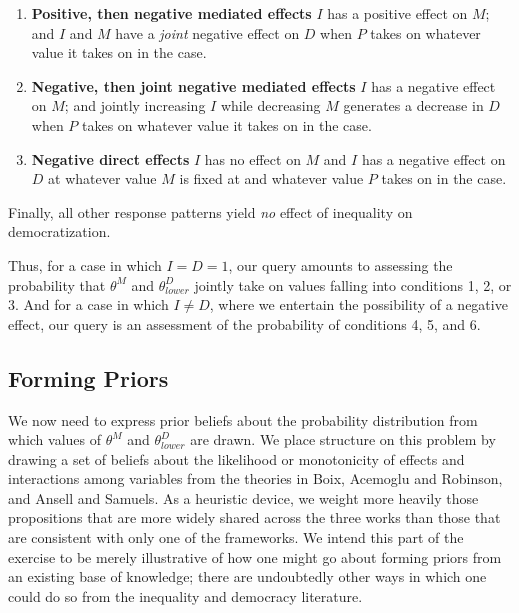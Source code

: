 \documentclass[
  12pt,
]{book}
\begin{document}
\begin{enumerate}
\def\labelenumi{\arabic{enumi}.}
\setcounter{enumi}{3}
\item
  \textbf{Positive, then negative mediated effects} \(I\) has a positive effect on \(M\); and \(I\) and \(M\) have a \emph{joint} negative effect on \(D\) when \(P\) takes on whatever value it takes on in the case.
\item
  \textbf{Negative, then joint negative mediated effects} \(I\) has a negative effect on \(M\); and jointly increasing \(I\) while decreasing \(M\) generates a decrease in \(D\) when \(P\) takes on whatever value it takes on in the case.
\item
  \textbf{Negative direct effects} \(I\) has no effect on \(M\) and \(I\) has a negative effect on \(D\) at whatever value \(M\) is fixed at and whatever value \(P\) takes on in the case.
\end{enumerate}

Finally, all other response patterns yield \emph{no} effect of inequality on democratization.

Thus, for a case in which \(I=D=1\), our query amounts to assessing the probability that \(\theta^M\) and \(\theta^D_{lower}\) jointly take on values falling into conditions 1, 2, or 3. And for a case in which \(I \neq D\), where we entertain the possibility of a negative effect, our query is an assessment of the probability of conditions 4, 5, and 6.

\hypertarget{forming-priors}{%
\subsection{Forming Priors}\label{forming-priors}}

We now need to express prior beliefs about the probability distribution from which values of \(\theta^M\) and \(\theta^D_{lower}\) are drawn. We place structure on this problem by drawing a set of beliefs about the likelihood or monotonicity of effects and interactions among variables from the theories in Boix, Acemoglu and Robinson, and Ansell and Samuels. As a heuristic device, we weight more heavily those propositions that are more widely shared across the three works than those that are consistent with only one of the frameworks. We intend this part of the exercise to be merely illustrative of how one might go about forming priors from an existing base of knowledge; there are undoubtedly other ways in which one could do so from the inequality and democracy literature.
\end{document}
